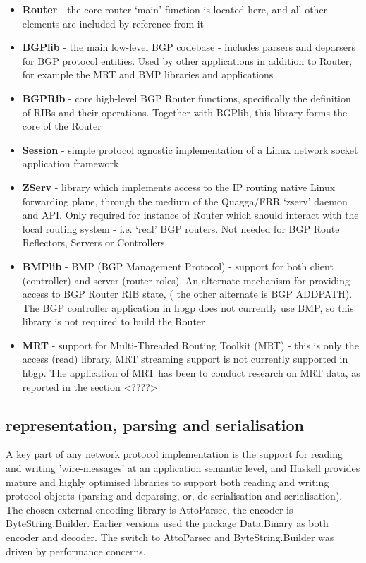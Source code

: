 \begin{itemize}
    \item \textbf{Router} - the core router `main' function is located here, and all other elements are included by reference from it
    \item \textbf{BGPlib} - the main low-level BGP codebase - includes parsers and deparsers for BGP protocol entities.  Used by other applications in addition to Router, for example the MRT and BMP libraries and applications
    \item \textbf{BGPRib} - core high-level BGP Router functions, specifically the definition of RIBs and their operations.  Together with BGPlib, this library forms the core of the Router
    \item \textbf{Session} - simple protocol agnostic implementation of a Linux network socket application framework
    \item \textbf{ZServ} - library which implements access to the IP routing native Linux forwarding plane, through the medium of the Quagga/FRR `zserv' daemon and API.  Only required for instance of Router which should interact with the local routing system - i.e. `real' BGP routers.  Not needed for BGP Route Reflectors, Servers or Controllers.
    \item \textbf{BMPlib} - BMP (BGP Management Protocol) - support for both client (controller) and server (router roles).  An alternate mechanism for providing access to BGP Router RIB state, ( the other alternate is BGP ADDPATH).  The BGP controller application in hbgp does not currently use BMP, so this library is not required to build the Router
    \item \textbf{MRT} - support for Multi-Threaded Routing Toolkit (MRT) - this is only the access (read) library, MRT streaming support is not currently supported in hbgp.  The application of MRT has been to conduct research on MRT data, as reported in the section <????>
\end{itemize}



\subsection{representation, parsing and serialisation} \label{RPS}
A key part of any network protocol implementation is the support for reading and writing 'wire-messages' at an application semantic level, and Haskell provides mature and highly optimised libraries to support both reading and writing protocol objects (parsing and deparsing, or, de-serialisation and serialisation).
The chosen external encoding library is AttoParsec\cite{BOS1}\cite{BOS2}, the encoder is ByteString.Builder\cite{builder1}\cite{builder2}.  Earlier versions used the package Data.Binary\cite{binary1}\cite{binary2} as both encoder and decoder.  The switch to AttoParsec and ByteString.Builder was driven by performance concerns.

